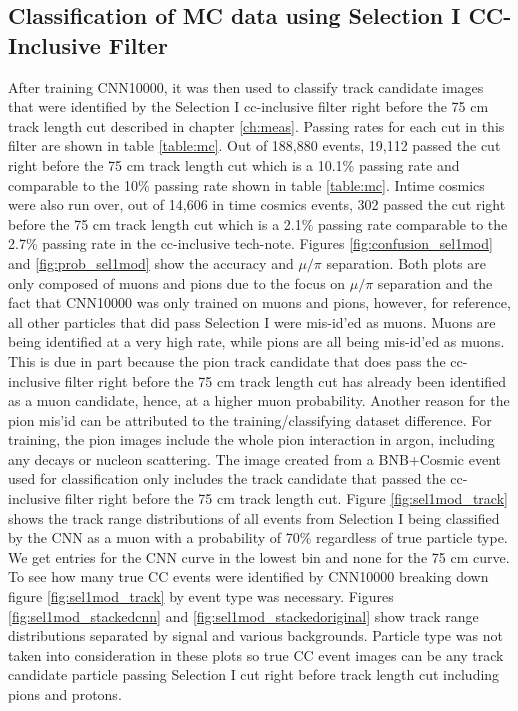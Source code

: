 \subsection{Classification of MC data using Selection I CC-Inclusive Filter}

After training CNN10000, it was then used to classify track candidate images that were identified by the Selection I cc-inclusive filter right before the 75 cm track length cut described in chapter \ref{ch:meas}. Passing rates for each cut in this filter are shown in table \ref{table:mc}. Out of 188,880 events, 19,112 passed the cut right before the 75 cm track length cut which is a 10.1\% passing rate and comparable to the 10\% passing rate shown in table \ref{table:mc}. Intime cosmics were also run over, out of 14,606 in time cosmics events, 302 passed the cut right before the 75 cm track length cut which is a 2.1\% passing rate comparable to the 2.7\% passing rate in the cc-inclusive tech-note. Figures \ref{fig:confusion_sel1mod} and \ref{fig:prob_sel1mod} show the accuracy and $\mu/\pi$ separation. Both plots are only composed of muons and pions due to the focus on $\mu/\pi$ separation and the fact that CNN10000 was only trained on muons and pions, however, for reference, all other particles that did pass Selection I were mis-id'ed as muons. Muons are being identified at a very high rate, while pions are all being mis-id'ed as muons. This is due in part because the pion track candidate that does pass the cc-inclusive filter right before the 75 cm track length cut has already been identified as a muon candidate, hence, at a higher muon probability. Another reason for the pion mis'id can be attributed to the training/classifying dataset difference. For training, the pion images include the whole pion interaction in argon, including any decays or nucleon scattering. The image created from a BNB+Cosmic event used for classification only includes the track candidate that passed the cc-inclusive filter right before the 75 cm track length cut.
Figure \ref{fig:sel1mod_track} shows the track range distributions of all events from Selection I being classified by the CNN as a muon with a probability of 70\% regardless of true particle type. We get entries for the CNN curve in the lowest bin and none for the 75 cm curve. To see how many true CC events were identified by CNN10000 breaking down figure \ref{fig:sel1mod_track} by event type was necessary. Figures \ref{fig:sel1mod_stackedcnn} and \ref{fig:sel1mod_stackedoriginal} show track range distributions separated by signal and various backgrounds. Particle type was not taken into consideration in these plots so true CC event images can be any track candidate particle passing Selection I cut right before track length cut including pions and protons. 

